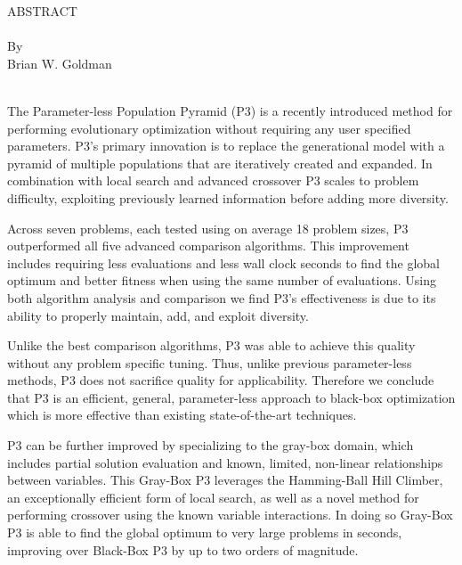 \thispagestyle{empty} \setcounter{page}{2}
\begin{doublespace}
\begin{centering}
ABSTRACT\\ %
\MyTitle\\ %
By \\ %
Brian W. Goldman\\ %
\ \\
\end{centering}

The Parameter-less Population Pyramid (P3) is a recently introduced method for performing
evolutionary optimization without requiring any user specified parameters.
P3's primary innovation is to replace the generational model with a pyramid of
multiple populations that are iteratively created and expanded. In combination
with local search and advanced crossover P3 scales to problem difficulty, exploiting
previously learned information before adding more diversity.

Across seven problems, each tested using on average 18 problem sizes, P3 outperformed
all five advanced comparison algorithms. This improvement includes requiring less evaluations
and less wall clock seconds to find the global optimum and better fitness when using
the same number of evaluations. Using both algorithm analysis and comparison we find P3's
effectiveness is due to its ability to properly maintain, add, and exploit diversity.

Unlike the best comparison algorithms, P3 was able to achieve this quality without any
problem specific tuning. Thus, unlike previous parameter-less methods, P3 does not
sacrifice quality for applicability. Therefore we conclude that
P3 is an efficient, general, parameter-less approach to black-box
optimization which is more effective than existing state-of-the-art techniques.

P3 can be further improved by specializing to the gray-box domain, which includes
partial solution evaluation and known, limited, non-linear relationships between variables.
This Gray-Box P3 leverages the Hamming-Ball Hill Climber, an exceptionally efficient
form of local search, as well as a novel method for performing crossover using the
known variable interactions. In doing so Gray-Box P3 is able to find the global
optimum to very large problems in seconds, improving over Black-Box P3 by up to
two orders of magnitude.
\end{doublespace}
\newpage
